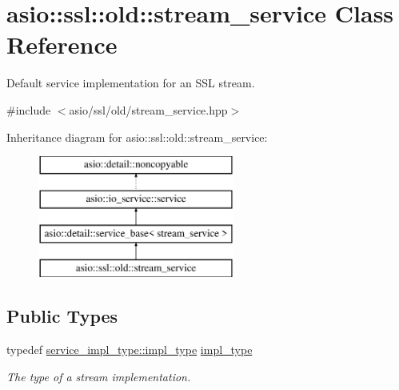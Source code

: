 \hypertarget{classasio_1_1ssl_1_1old_1_1stream__service}{}\section{asio\+:\+:ssl\+:\+:old\+:\+:stream\+\_\+service Class Reference}
\label{classasio_1_1ssl_1_1old_1_1stream__service}


Default service implementation for an S\+S\+L stream.  




{\ttfamily \#include $<$asio/ssl/old/stream\+\_\+service.\+hpp$>$}

Inheritance diagram for asio\+:\+:ssl\+:\+:old\+:\+:stream\+\_\+service\+:\begin{figure}[H]
\begin{center}
\leavevmode
\includegraphics[height=4.000000cm]{classasio_1_1ssl_1_1old_1_1stream__service}
\end{center}
\end{figure}
\subsection*{Public Types}
\begin{DoxyCompactItemize}
\item 
typedef \hyperlink{classasio_1_1ssl_1_1old_1_1detail_1_1openssl__stream__service_a2419fd5a889197ed63b6d0bd14656027}{service\+\_\+impl\+\_\+type\+::impl\+\_\+type} \hyperlink{classasio_1_1ssl_1_1old_1_1stream__service_a7e2131ccd16fbc04d0f86c61288e4175}{impl\+\_\+type}
\begin{DoxyCompactList}\small\item\em The type of a stream implementation. \end{DoxyCompactList}\end{DoxyCompactItemize}
